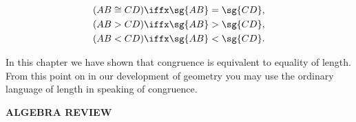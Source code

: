 \documentclass[11pt]{book}
\theoremstyle{bkplain}
\newcommand{\Vhead}[1]{%
  \par\bigskip\begin{center}\bfseries\large\MakeUppercase{#1}\end{center}%
  \par\nopagebreak\medskip}
\theoremstyle{XIplainnote}
\theoremstyle{bkplain}
\theoremstyle{bkplain}
\begin{document}
\begin{exercisecols}
\begin{align*}
(AB \cong CD) &\iffx \sg{AB} = \sg{CD},\\
(AB > CD) &\iffx \sg{AB} > \sg{CD},\\
(AB < CD) &\iffx \sg{AB} < \sg{CD}.
\end{align*}

\begin{note}
In this chapter we have shown that congruence is equivalent to equality of
length. From this point on in our development of geometry you may use the
ordinary language of length in speaking of congruence.
\end{note}

\Vhead{Algebra Review}


\end{exercisecols}
\end{document}
